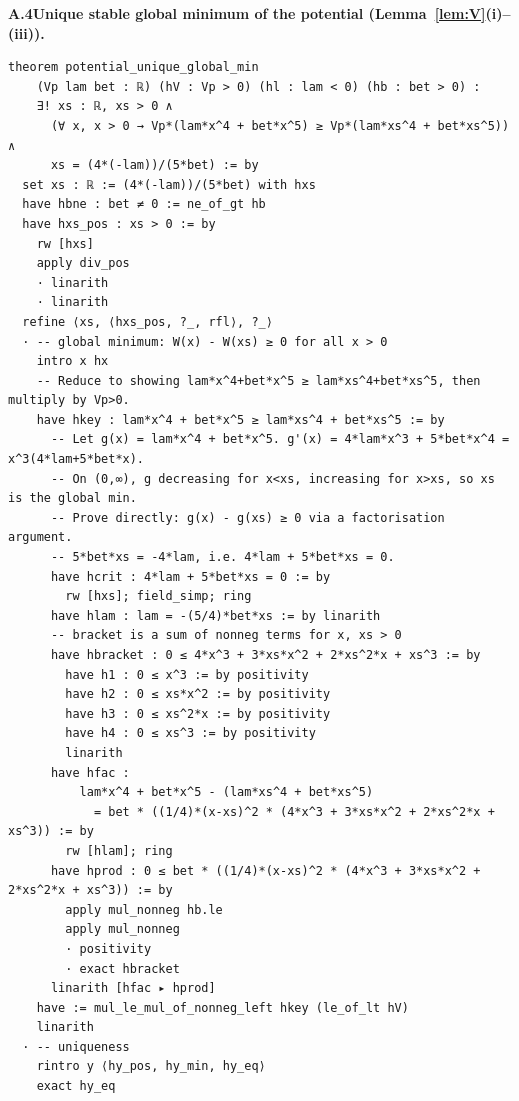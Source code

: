 \medskip \noindent\textbf{A.4\quad Unique stable global minimum of the potential (Lemma~\ref{lem:V}(i)--(iii)).}
\begin{verbatim}
theorem potential_unique_global_min
    (Vp lam bet : ℝ) (hV : Vp > 0) (hl : lam < 0) (hb : bet > 0) :
    ∃! xs : ℝ, xs > 0 ∧
      (∀ x, x > 0 → Vp*(lam*x^4 + bet*x^5) ≥ Vp*(lam*xs^4 + bet*xs^5)) ∧
      xs = (4*(-lam))/(5*bet) := by
  set xs : ℝ := (4*(-lam))/(5*bet) with hxs
  have hbne : bet ≠ 0 := ne_of_gt hb
  have hxs_pos : xs > 0 := by
    rw [hxs]
    apply div_pos
    · linarith
    · linarith
  refine ⟨xs, ⟨hxs_pos, ?_, rfl⟩, ?_⟩
  · -- global minimum: W(x) - W(xs) ≥ 0 for all x > 0
    intro x hx
    -- Reduce to showing lam*x^4+bet*x^5 ≥ lam*xs^4+bet*xs^5, then multiply by Vp>0.
    have hkey : lam*x^4 + bet*x^5 ≥ lam*xs^4 + bet*xs^5 := by
      -- Let g(x) = lam*x^4 + bet*x^5. g'(x) = 4*lam*x^3 + 5*bet*x^4 = x^3(4*lam+5*bet*x).
      -- On (0,∞), g decreasing for x<xs, increasing for x>xs, so xs is the global min.
      -- Prove directly: g(x) - g(xs) ≥ 0 via a factorisation argument.
      -- 5*bet*xs = -4*lam, i.e. 4*lam + 5*bet*xs = 0.
      have hcrit : 4*lam + 5*bet*xs = 0 := by
        rw [hxs]; field_simp; ring
      have hlam : lam = -(5/4)*bet*xs := by linarith
      -- bracket is a sum of nonneg terms for x, xs > 0
      have hbracket : 0 ≤ 4*x^3 + 3*xs*x^2 + 2*xs^2*x + xs^3 := by
        have h1 : 0 ≤ x^3 := by positivity
        have h2 : 0 ≤ xs*x^2 := by positivity
        have h3 : 0 ≤ xs^2*x := by positivity
        have h4 : 0 ≤ xs^3 := by positivity
        linarith
      have hfac :
          lam*x^4 + bet*x^5 - (lam*xs^4 + bet*xs^5)
            = bet * ((1/4)*(x-xs)^2 * (4*x^3 + 3*xs*x^2 + 2*xs^2*x + xs^3)) := by
        rw [hlam]; ring
      have hprod : 0 ≤ bet * ((1/4)*(x-xs)^2 * (4*x^3 + 3*xs*x^2 + 2*xs^2*x + xs^3)) := by
        apply mul_nonneg hb.le
        apply mul_nonneg
        · positivity
        · exact hbracket
      linarith [hfac ▸ hprod]
    have := mul_le_mul_of_nonneg_left hkey (le_of_lt hV)
    linarith
  · -- uniqueness
    rintro y ⟨hy_pos, hy_min, hy_eq⟩
    exact hy_eq
\end{verbatim}

